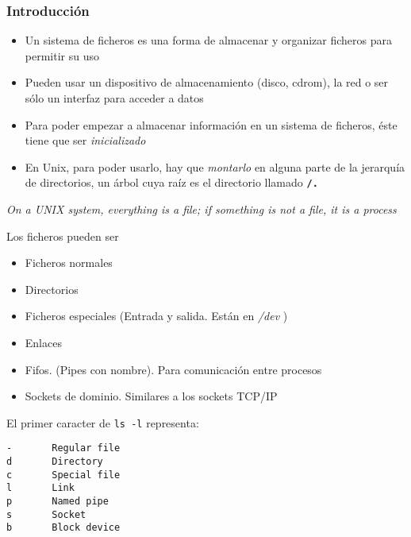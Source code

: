 \documentclass[ucs]{beamer}
\begin{document}
\begin{frame}[fragile]
\frametitle{Introducción}
  
  \begin{itemize}
    \item Un sistema de ficheros es una forma de almacenar y organizar ficheros para
permitir su uso
 \item Pueden usar un dispositivo de almacenamiento (disco, cdrom), la red o ser sólo
un interfaz para acceder a datos
    \item Para poder empezar a almacenar información en un sistema de ficheros,
      éste tiene que ser \emph{inicializado}
    \item En Unix, para poder usarlo, hay que \emph{montarlo} en alguna parte de
      la jerarquía de directorios, un árbol cuya raíz es
      el directorio llamado \texttt{\textbf{/.}}
  \end{itemize}


\end{frame}


\begin{frame}[fragile]
\emph{On a UNIX system, everything is a file; if something is not a file, it is a process}

Los ficheros pueden ser
 \begin{itemize}
\item
Ficheros normales
\item
Directorios
\item
Ficheros especiales (Entrada y salida. Están en \emph{/dev })
\item
Enlaces
\item
Fifos. (Pipes con nombre). Para comunicación entre procesos
\item
Sockets de dominio. Similares a los sockets TCP/IP
  \end{itemize}

\end{frame}

\begin{frame}[fragile]


El primer caracter de \verb|ls -l| representa:
\begin{verbatim}
-       Regular file
d       Directory
c       Special file
l       Link
p       Named pipe
s       Socket
b       Block device
\end{verbatim}


\end{frame}
\end{document}
